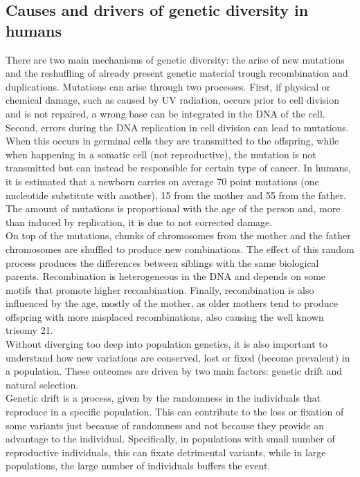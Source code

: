\subsection{Causes and drivers of genetic diversity in humans}
There are two main mechanisms of genetic diversity: the arise of new mutations and the reshuffling of already present genetic material trough recombination and duplications. Mutations can arise through two processes. First, if physical or chemical damage, such as caused by UV radiation, occurs prior to cell division and is not repaired, a wrong base can be integrated in the DNA of the cell. Second, errors during the DNA replication in cell division can lead to mutations. When this occurs in germinal cells they are transmitted to the offspring, while when happening in a somatic cell (not reproductive), the mutation is not transmitted but can instead be responsible for certain type of cancer. In humans, it is estimated that a newborn carries on average 70 point mutations (one nucleotide substitute with another), 15 from the mother and 55 from the father. The amount of mutations is proportional with the age of the person and, more than induced by replication, it is due to not corrected damage.\\
On top of the mutations, chunks of chromosomes from the mother and the father chromosomes are shuffled to produce new combinations. The effect of this random process produces the differences between siblings with the same biological parents. Recombination is heterogeneous in the DNA and depends on some motifs that promote higher recombination. Finally, recombination is also influenced by the age, mostly of the mother, as older mothers tend to produce offspring with more misplaced recombinations, also causing the well known trisomy 21.\\
Without diverging too deep into population genetics, it is also important to understand how new variations are conserved, lost or fixed (become prevalent) in a population. These outcomes are driven by two main factors: genetic drift and natural selection.\\
Genetic drift is a process, given by the randomness in the individuals that reproduce in a specific population. This can contribute to the loss or fixation of some variants just because of randomness and not because they provide an advantage to the individual. Specifically, in populations with small number of reproductive individuals, this can fixate detrimental variants, while in large populations, the large number of individuals buffers the event. \\

